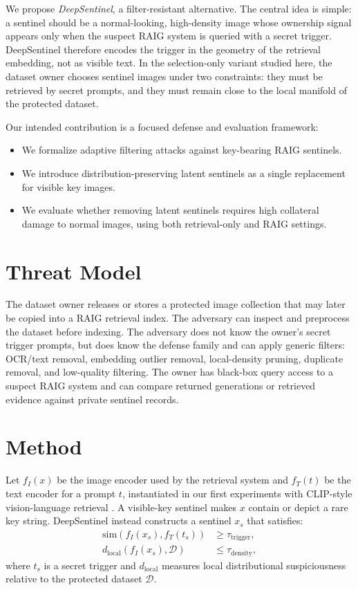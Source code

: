 \documentclass[letterpaper]{article}
\begin{document}
We propose \emph{DeepSentinel}, a filter-resistant alternative. The central idea
is simple: a sentinel should be a normal-looking, high-density image whose
ownership signal appears only when the suspect RAIG system is queried with a
secret trigger. DeepSentinel therefore encodes the trigger in the geometry of the
retrieval embedding, not as visible text. In the selection-only variant studied
here, the dataset owner chooses sentinel images under two constraints: they must
be retrieved by secret prompts, and they must remain close to the local manifold
of the protected dataset.

Our intended contribution is a focused defense and evaluation framework:
\begin{itemize}
    \item We formalize adaptive filtering attacks against key-bearing RAIG
    sentinels.
    \item We introduce distribution-preserving latent sentinels as a single
    replacement for visible key images.
    \item We evaluate whether removing latent sentinels requires high collateral
    damage to normal images, using both retrieval-only and RAIG settings.
\end{itemize}

\section{Threat Model}

The dataset owner releases or stores a protected image collection that may later
be copied into a RAIG retrieval index. The adversary can inspect and preprocess
the dataset before indexing. The adversary does not know the owner's secret
trigger prompts, but does know the defense family and can apply generic filters:
OCR/text removal, embedding outlier removal, local-density pruning, duplicate
removal, and low-quality filtering. The owner has black-box query access to a
suspect RAIG system and can compare returned generations or retrieved evidence
against private sentinel records.

\section{Method}

Let $f_I(x)$ be the image encoder used by the retrieval system and $f_T(t)$ be
the text encoder for a prompt $t$, instantiated in our first experiments with
CLIP-style vision-language retrieval \cite{clip2021}. A visible-key sentinel
makes $x$ contain or depict a rare key string. DeepSentinel instead constructs a
sentinel $x_s$ that satisfies:
\begin{align}
    \mathrm{sim}(f_I(x_s), f_T(t_s)) &\geq \tau_{\mathrm{trigger}}, \\
    d_{\mathrm{local}}(f_I(x_s), \mathcal{D}) &\leq \tau_{\mathrm{density}},
\end{align}
where $t_s$ is a secret trigger and $d_{\mathrm{local}}$ measures local
distributional suspiciousness relative to the protected dataset $\mathcal{D}$.
\end{document}
